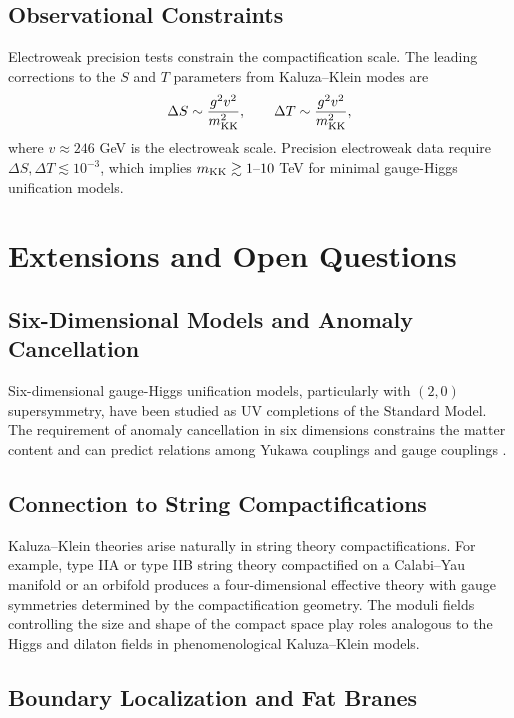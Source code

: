 \subsection{Observational Constraints}

Electroweak precision tests constrain the compactification scale.  The
leading corrections to the \(S\) and \(T\) parameters from Kaluza--Klein modes are
\begin{equation}
  \Delta S \sim \frac{g^2 v^2}{m_{\rm KK}^2}, \qquad
  \Delta T \sim \frac{g^2 v^2}{m_{\rm KK}^2},
  \label{eq:oblique-corrections}
\end{equation}
where \(v \approx 246\) GeV is the electroweak scale.  Precision electroweak data
require \(\Delta S, \Delta T \lesssim 10^{-3}\), which implies
\(m_{\rm KK} \gtrsim 1\text{--}10\) TeV for minimal gauge-Higgs unification models.

\section{Extensions and Open Questions}

\subsection{Six-Dimensional Models and Anomaly Cancellation}

Six-dimensional gauge-Higgs unification models, particularly with \((2,0)\)
supersymmetry, have been studied as UV completions of the Standard Model.  The
requirement of anomaly cancellation in six dimensions constrains the matter content
and can predict relations among Yukawa couplings and gauge couplings
\cite{Csaki2004}.

\subsection{Connection to String Compactifications}

Kaluza--Klein theories arise naturally in string theory compactifications.  For
example, type IIA or type IIB string theory compactified on a Calabi--Yau manifold
or an orbifold produces a four-dimensional effective theory with gauge symmetries
determined by the compactification geometry.  The moduli fields controlling the
size and shape of the compact space play roles analogous to the Higgs and dilaton
fields in phenomenological Kaluza--Klein models.

\subsection{Boundary Localization and Fat Branes}

